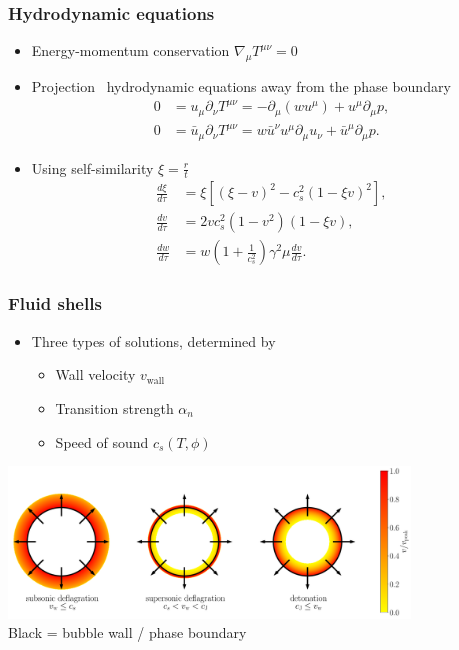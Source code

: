 \begin{frame}
    \frametitle{Hydrodynamic equations}
    \begin{itemize}
        \item Energy-momentum conservation $\nabla_\mu T^{\mu\nu} = 0$
        \item Projection \textrightarrow \ hydrodynamic equations away from the phase boundary
        \begin{align}
            0 &= u_\mu \partial_\nu T^{\mu \nu} = -\partial_\mu (w u^\mu) + u^\mu \partial_\mu p, \\
            0 &= \bar{u}_\mu \partial_\nu T^{\mu \nu} = w \bar{u}^\nu u^\mu \partial_\mu u_\nu + \bar{u}^\mu \partial_\mu p.
        \end{align}
        \item Using self-similarity $\xi = \frac{r}{t}$
        \begin{align}
            \frac{d\xi}{d\tau} &= \xi \left[ (\xi - v)^2 - c_s^2 (1 - \xi v)^2 \right], \\
            \frac{dv}{d\tau} &= 2 v c_s^2 (1 - v^2) (1 - \xi v), \\
            \frac{dw}{d\tau} &= w \left( 1 + \frac{1}{c_s^2} \right) \gamma^2 \mu \frac{dv}{d\tau}.
        \end{align}
    \end{itemize}
\end{frame}

\begin{frame}
    \frametitle{Fluid shells}
    \begin{itemize}
        \item Three types of solutions, determined by
        \begin{itemize}
            \item Wall velocity $v_\text{wall}$
            \item Transition strength $\alpha_n$
            \item Speed of sound $c_s(T,\phi)$
        \end{itemize}
    \end{itemize}
    \includegraphics[width=0.8\textwidth]{../fig/all_circle.pdf} \\
    {\footnotesize Black = bubble wall / phase boundary}
\end{frame}

